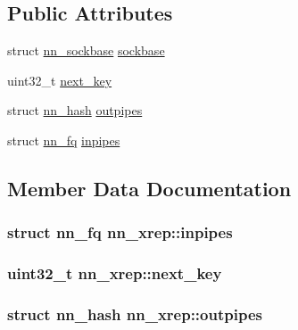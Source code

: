 \subsection*{Public Attributes}
\begin{DoxyCompactItemize}
\item 
struct \hyperlink{structnn__sockbase}{nn\+\_\+sockbase} \hyperlink{structnn__xrep_add8f981681f3c0a7a4d33b291769d9de}{sockbase}
\item 
uint32\+\_\+t \hyperlink{structnn__xrep_a0576b0acb4308a6fd5e5cbcd7fd29537}{next\+\_\+key}
\item 
struct \hyperlink{structnn__hash}{nn\+\_\+hash} \hyperlink{structnn__xrep_aaeb940475be9b683f7525ae4f1086f53}{outpipes}
\item 
struct \hyperlink{structnn__fq}{nn\+\_\+fq} \hyperlink{structnn__xrep_ac212c37239144956802b4ca502688325}{inpipes}
\end{DoxyCompactItemize}


\subsection{Member Data Documentation}
\subsubsection[{inpipes}]{\setlength{\rightskip}{0pt plus 5cm}struct {\bf nn\+\_\+fq} nn\+\_\+xrep\+::inpipes}\hypertarget{structnn__xrep_ac212c37239144956802b4ca502688325}{}\label{structnn__xrep_ac212c37239144956802b4ca502688325}
\subsubsection[{next\+\_\+key}]{\setlength{\rightskip}{0pt plus 5cm}uint32\+\_\+t nn\+\_\+xrep\+::next\+\_\+key}\hypertarget{structnn__xrep_a0576b0acb4308a6fd5e5cbcd7fd29537}{}\label{structnn__xrep_a0576b0acb4308a6fd5e5cbcd7fd29537}
\subsubsection[{outpipes}]{\setlength{\rightskip}{0pt plus 5cm}struct {\bf nn\+\_\+hash} nn\+\_\+xrep\+::outpipes}\hypertarget{structnn__xrep_aaeb940475be9b683f7525ae4f1086f53}{}\label{structnn__xrep_aaeb940475be9b683f7525ae4f1086f53}
